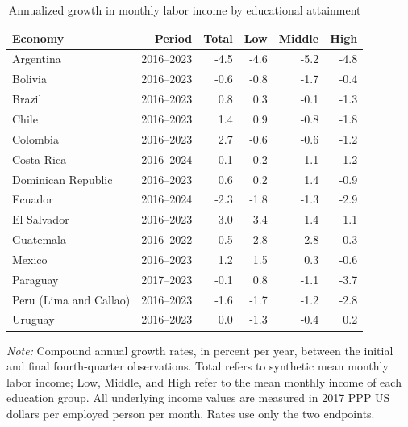 \begin{table}[htbp]
\centering
\caption{Annualized growth in monthly labor income by educational attainment}
\label{tab:latam_country_annualized_growth}
\small
\begin{tabular}{lrrrrr}
\toprule
Economy & Period & Total & Low & Middle & High \\
\midrule
Argentina & 2016--2023 & -4.5 & -4.6 & -5.2 & -4.8 \\
Bolivia & 2016--2023 & -0.6 & -0.8 & -1.7 & -0.4 \\
Brazil & 2016--2023 & 0.8 & 0.3 & -0.1 & -1.3 \\
Chile & 2016--2023 & 1.4 & 0.9 & -0.8 & -1.8 \\
Colombia & 2016--2023 & 2.7 & -0.6 & -0.6 & -1.2 \\
Costa Rica & 2016--2024 & 0.1 & -0.2 & -1.1 & -1.2 \\
Dominican Republic & 2016--2023 & 0.6 & 0.2 & 1.4 & -0.9 \\
Ecuador & 2016--2024 & -2.3 & -1.8 & -1.3 & -2.9 \\
El Salvador & 2016--2023 & 3.0 & 3.4 & 1.4 & 1.1 \\
Guatemala & 2016--2022 & 0.5 & 2.8 & -2.8 & 0.3 \\
Mexico & 2016--2023 & 1.2 & 1.5 & 0.3 & -0.6 \\
Paraguay & 2017--2023 & -0.1 & 0.8 & -1.1 & -3.7 \\
Peru (Lima and Callao) & 2016--2023 & -1.6 & -1.7 & -1.2 & -2.8 \\
Uruguay & 2016--2023 & 0.0 & -1.3 & -0.4 & 0.2 \\
\bottomrule
\end{tabular}
\begin{minipage}{0.98\textwidth}
\footnotesize
\textit{Note:} Compound annual growth rates, in percent per year, between the initial and final fourth-quarter observations. Total refers to synthetic mean monthly labor income; Low, Middle, and High refer to the mean monthly income of each education group. All underlying income values are measured in 2017 PPP US dollars per employed person per month. Rates use only the two endpoints.
\end{minipage}
\end{table}
